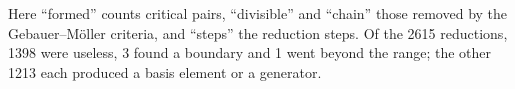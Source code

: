 \documentclass[11pt]{article}
\begin{document}
Here ``formed'' counts critical pairs, ``divisible'' and ``chain'' those removed by the Gebauer--M\"oller criteria, and ``steps'' the reduction steps. Of the 2615 reductions, 1398 were useless, 3 found a boundary and 1 went beyond the range; the other 1213 each produced a basis element or a generator.
\end{document}

